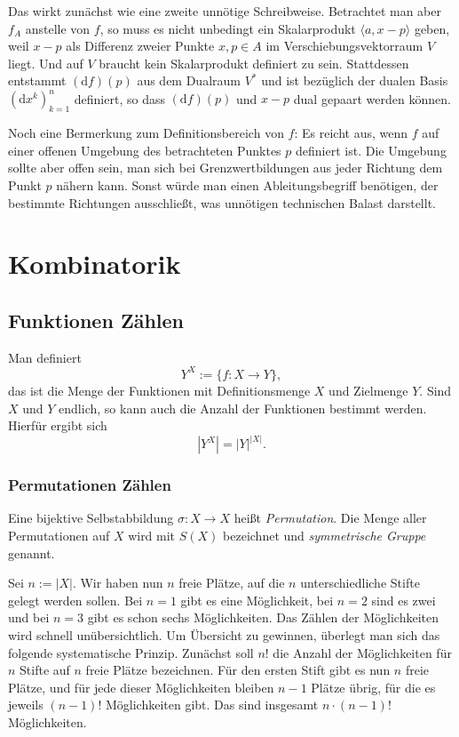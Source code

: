 \documentclass[a4paper,11pt,fleqn,twoside]{scrartcl}
\numberwithin{equation}{section}
\newcommand{\strong}[1]{{\sf\bfseries #1}}
\newenvironment{Definition}{\par\noindent\strong{Definition.}}{\par}
\newcommand{\emdef}[1]{\emph{#1}}
\begin{document}
Das wirkt zunächst wie eine zweite unnötige Schreibweise. Betrachtet
man aber $f_A$ anstelle von $f$, so muss es nicht unbedingt ein
Skalarprodukt $\langle a,x-p\rangle$ geben, weil $x-p$ als
Differenz zweier Punkte $x,p\in A$ im Verschiebungsvektorraum
$V$ liegt. Und auf $V$ braucht kein Skalarprodukt definiert zu sein.
Stattdessen entstammt $(\mathrm df)(p)$ aus dem Dualraum $V^\ast$
und ist bezüglich der dualen Basis $(\mathrm dx^k)_{k=1}^n$ definiert,
so dass $(\mathrm df)(p)$ und $x-p$ dual gepaart werden können.

Noch eine Bermerkung zum Definitionsbereich von $f$: Es reicht aus,
wenn $f$ auf einer offenen Umgebung des betrachteten Punktes $p$
definiert ist. Die Umgebung sollte aber offen sein, man sich bei
Grenzwertbildungen aus jeder Richtung dem Punkt $p$ nähern kann.
Sonst würde man einen Ableitungsbegriff benötigen, der bestimmte
Richtungen ausschließt, was unnötigen
technischen Balast darstellt.

\section{Kombinatorik}
\subsection{Funktionen Zählen}
Man definiert
\begin{equation}
Y^X := \{f\colon X\to Y\},
\end{equation}
das ist die Menge der Funktionen mit Definitionsmenge $X$ und
Zielmenge $Y$. Sind $X$ und $Y$ endlich, so kann auch die
Anzahl der Funktionen bestimmt werden. Hierfür ergibt sich
\begin{equation}
|Y^X| = |Y|^{|X|}.
\end{equation}

\subsubsection{Permutationen Zählen}
\begin{Definition}
Eine bijektive Selbstabbildung $\sigma\colon X\to X$ heißt
\emdef{Permutation}. Die Menge aller Permutationen auf $X$ wird mit
$S(X)$ bezeichnet und \emdef{symmetrische Gruppe} genannt.
\end{Definition}
Sei $n:=|X|$. Wir haben nun $n$ freie Plätze, auf die $n$
unterschiedliche Stifte gelegt werden sollen. Bei $n=1$ gibt es
eine Möglichkeit, bei $n=2$ sind es zwei und bei $n=3$ gibt es schon
sechs Möglichkeiten. Das Zählen der Möglichkeiten wird schnell
unübersichtlich. Um Übersicht zu gewinnen, überlegt man sich das
folgende systematische Prinzip. Zunächst soll $n!$ die Anzahl der
Möglichkeiten für $n$ Stifte auf $n$ freie Plätze bezeichnen.
Für den ersten Stift gibt es nun $n$ freie Plätze, und für jede
dieser Möglichkeiten bleiben $n-1$ Plätze übrig, für die es jeweils
$(n-1)!$ Möglichkeiten gibt. Das sind insgesamt $n\cdot (n-1)!$
Möglichkeiten.
\end{document}
